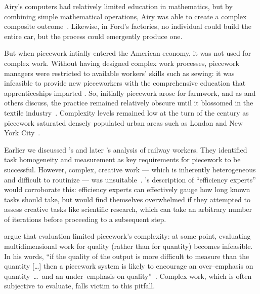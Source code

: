 \documentclass[trackingWork]{subfiles}
\begin{document}

Airy's computers had relatively limited education in mathematics, but by combining simple mathematical operations, Airy was able to create a complex composite outcome~\cite{grier2013computers}.
Likewise, in Ford's factories, no individual could build the entire car, but the process could emergently produce one.

But when piecework intially entered the American economy,
it was not used for complex work.
Without having designed complex work processes, piecework managers were restricted to available workers' skills such as sewing: it was infeasible to provide new pieceworkers with the comprehensive education
that apprenticeships imparted \cite{hart2013rise}.
So, initially piecework arose for farmwork, and as
\citeauthor{hughRaynbirdTaskWork} and others discuss,
the practice remained relatively obscure until
it blossomed in the textile industry~\cite{hughRaynbirdTaskWork}.
Complexity levels remained low at the turn of
the  century as piecework saturated densely populated urban areas
such as London and New York City~\cite{riisOtherSideLives}.

Earlier we discussed \citeauthor{10.2307/23702539}'s and later \citeauthor{Brown01041990}'s analysis of railway workers.
They identified task homogeneity and measurement as key requirements for piecework to be successful.
However, complex, creative work
--- which is inherently heterogeneous and difficult to routinize ---
was unsuitable~\cite{10.2307/23702539}.
\citeauthor{Brown01041990}'s description of ``efficiency experts'' would corroborate this:
efficiency experts can effectively gauge how long known tasks should take, but
would find themselves overwhelmed if they attempted to assess creative tasks like scientific research,
which can take an arbitrary number of iterations before proceeding to a subsequent step.


\citeauthor{hart2016rise} argue that evaluation limited piecework's complexity:
at some point, evaluating multidimensional work for quality
(rather than for quantity) becomes infeasible.
In his words,
``if the quality of the output is more difficult to measure than the quantity [\ldots]
then a piecework system is likely to encourage
an over--emphasis on quantity~\dots~and an under--emphasis on quality''~\cite{hart2016rise}.
Complex work, which is often subjective to evaluate, falls victim to this pitfall.
\end{document}
